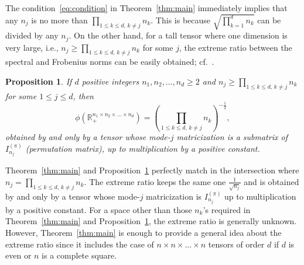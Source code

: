 \documentclass[11pt]{article}
\newtheorem{proposition}[theorem]{Proposition}
\newcommand{\R}{\mathbb{R}}
\begin{document}
The condition~\eqref{eq:condition} in Theorem~\ref{thm:main} immediately implies that any $n_j$ is no more than $\prod_{1\le k\le d,\,k\ne j}n_k$. This is because $\sqrt{\prod_{k=1}^dn_k}$ can be divided by any $n_j$. On the other hand, for a tall tensor where one dimension is very large, i.e., $n_j\ge\prod_{1\le k\le d,\,k\ne j}n_k$ for some $j$, the extreme ratio between the spectral and Frobenius norms can be easily obtained; cf.~\cite[Proposition 2.3]{LNSU18}.
\begin{proposition}\label{thm:tall}
If $d$ positive integers $n_1,n_2,\dots,n_d\ge2$ and $n_j\ge\prod_{1\le k\le d,\,k\ne j}n_k$ for some $1\le j\le d$, then
\begin{equation}\label{eq:tall}
    \phi(\R_+^{n_1\times n_2\times\dots\times n_d})=\left(\prod_{1\le k\le d,\,k\ne j}n_k\right)^{-\frac{1}{2}},
\end{equation}
obtained by and only by a tensor whose mode-$j$ matricization is a submatrix of $I^{(\pi)}_{n_j}$ (permutation matrix), up to multiplication by a positive constant.
\end{proposition}

Theorem~\ref{thm:main} and Proposition~\ref{thm:tall} perfectly match in the intersection where $n_j=\prod_{1\le k\le d,\,k\ne j}n_k$. The extreme ratio keeps the same one $\frac{1}{\sqrt{n_j}}$ and is obtained by and only by a tensor whose mode-$j$ matricization is $I^{(\pi)}_{n_j}$ up to multiplication by a positive constant. For a space other than those $n_k$'s required in Theorem~\ref{thm:main} and Proposition~\ref{thm:tall}, the extreme ratio is generally unknown. However, Theorem~\ref{thm:main} is enough to provide a general idea about the extreme ratio since it includes the case of $n\times n\times \dots \times n$ tensors of order $d$ if $d$ is even or $n$ is a complete square.
\end{document}
